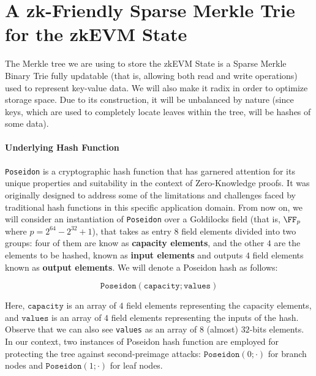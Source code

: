 



\section{A zk-Friendly Sparse Merkle Trie for the zkEVM State}

The Merkle tree we are using to store the zkEVM State is a Sparse Merkle Binary Trie fully updatable (that is, allowing both read and write operations)  used to represent key-value data. We will also make it radix in order to optimize storage space. Due to its construction, it will be unbalanced by nature (since keys, which are used to completely locate leaves within the tree, will be hashes of some data).

\paragraph*{Underlying Hash Function}

\texttt{Poseidon} is a cryptographic hash function that has garnered attention for its unique properties and suitability in the context of Zero-Knowledge proofs. It was originally designed to address some of the limitations and challenges faced by traditional hash functions in this specific application domain. From now on, we will consider an instantiation of \texttt{Poseidon} over a Goldilocks field (that is, $\FF_p$ where $p = 2^{64} - 2^{32} + 1$), that takes as entry $8$ field elements divided into two groups: four of them are know as \textbf{capacity elements}, and the other $4$ are the elements to be hashed, known as \textbf{input elements} and outputs $4$ field elements known as \textbf{output elements}. We will denote a Poseidon hash as follows:

\[
\texttt{Poseidon}(\texttt{capacity};\texttt{values})
\]

Here, $\texttt{capacity}$ is an array of $4$ field elements representing the capacity elements, and $\texttt{values}$ is an array of $4$ field elements representing the inputs of the hash. Observe that we can also see \texttt{values} as an array of $8$ (almost) $32$-bits elements. In our context, two instances of Poseidon hash function are employed for protecting the tree against second-preimage attacks: $\texttt{Poseidon}(0; \cdot)$ for branch nodes and $\texttt{Poseidon}(1; \cdot)$ for leaf nodes.


